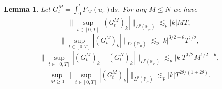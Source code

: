 \documentclass[11pt,a4paper,reqno]{amsart}
\newtheorem{lemma}{Lemma}
\newcommand{\PP}{\mathbb{P}}
\newcommand{\dd}{\mathrm{d}}
\begin{document}
\begin{lemma}
\label{lemma:main-bounds}
Let 
$
G^M_t = \int_0^t F_{M}(u_s) \dd  s
$.
 For any $M\le N$ we have
\begin{equation}
\label{eq:basic-est-1}
\|\sup_{t\in[0,T]} \left|(G^M_t)_k\right| \|_{L^p(\PP_\mu)}\lesssim_p |k| M T ,
\end{equation}
\begin{equation}
\label{eq:basic-est-2}
\|\sup_{t\in[0,T]} \left|(G^M_t)_k\right| \|_{L^p(\PP_\mu)}\lesssim_p |k|^{3/2-\theta} T^{1/2} ,
\end{equation}
\begin{equation}
\label{eq:basic-est-3}
\|\sup_{t\in[0,T]}\left|(G^M_t)_k-(G^N_t)_k\right| \|_{L^p(\PP_\mu)}\lesssim_p |k| T^{1/2} M^{1/2-\theta} ,
\end{equation}
\begin{equation}
\label{eq:basic-est-4}
\sup_{M\ge 0}\|\sup_{t\in[0,T]}\left|(G^M_t)_k\right| \|_{L^p(\PP_\mu)}\lesssim_p   |k| T^{2\theta/(1+2\theta)} .
\end{equation}
\end{lemma}
\end{document}
